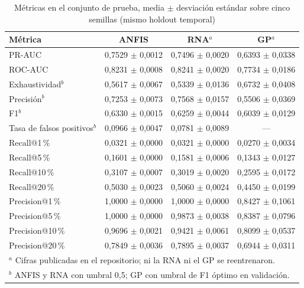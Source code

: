 \documentclass[conference]{IEEEtran}
\begin{document}
\begin{table}[htbp]
\caption{Métricas en el conjunto de prueba, media $\pm$ desviación estándar sobre cinco semillas (mismo holdout temporal)}
\label{tab:comparacion}
\centering
\scriptsize
\setlength{\tabcolsep}{2.5pt}
\begin{tabular}{lccc}
\toprule
\textbf{Métrica} & \textbf{ANFIS} & \textbf{RNA}$^{a}$ & \textbf{GP}$^{a}$\\
\midrule
PR-AUC & 0,7529 $\pm$ 0,0012 & 0,7496 $\pm$ 0,0020 & 0,6393 $\pm$ 0,0338\\
ROC-AUC & 0,8231 $\pm$ 0,0008 & 0,8241 $\pm$ 0,0020 & 0,7734 $\pm$ 0,0186\\
Exhaustividad$^{b}$ & 0,5617 $\pm$ 0,0067 & 0,5339 $\pm$ 0,0136 & 0,6732 $\pm$ 0,0408\\
Precisión$^{b}$ & 0,7253 $\pm$ 0,0073 & 0,7568 $\pm$ 0,0157 & 0,5506 $\pm$ 0,0369\\
F1$^{b}$ & 0,6330 $\pm$ 0,0015 & 0,6259 $\pm$ 0,0044 & 0,6039 $\pm$ 0,0129\\
Tasa de falsos positivos$^{b}$ & 0,0966 $\pm$ 0,0047 & 0,0781 $\pm$ 0,0089 & ---\\
\midrule
Recall@1\,\% & 0,0321 $\pm$ 0,0000 & 0,0321 $\pm$ 0,0000 & 0,0270 $\pm$ 0,0034\\
Recall@5\,\% & 0,1601 $\pm$ 0,0000 & 0,1581 $\pm$ 0,0006 & 0,1343 $\pm$ 0,0127\\
Recall@10\,\% & 0,3107 $\pm$ 0,0007 & 0,3019 $\pm$ 0,0020 & 0,2595 $\pm$ 0,0172\\
Recall@20\,\% & 0,5030 $\pm$ 0,0023 & 0,5060 $\pm$ 0,0024 & 0,4450 $\pm$ 0,0199\\
\midrule
Precision@1\,\% & 1,0000 $\pm$ 0,0000 & 1,0000 $\pm$ 0,0000 & 0,8427 $\pm$ 0,1061\\
Precision@5\,\% & 1,0000 $\pm$ 0,0000 & 0,9873 $\pm$ 0,0038 & 0,8387 $\pm$ 0,0796\\
Precision@10\,\% & 0,9696 $\pm$ 0,0021 & 0,9421 $\pm$ 0,0061 & 0,8099 $\pm$ 0,0537\\
Precision@20\,\% & 0,7849 $\pm$ 0,0036 & 0,7895 $\pm$ 0,0037 & 0,6944 $\pm$ 0,0311\\
\bottomrule
\multicolumn{4}{l}{$^{a}$ Cifras publicadas en el repositorio; ni la RNA ni el GP se reentrenaron.}\\
\multicolumn{4}{l}{$^{b}$ ANFIS y RNA con umbral 0,5; GP con umbral de F1 óptimo en validación.}\\
\end{tabular}
\end{table}
\end{document}
